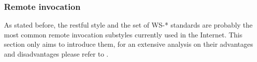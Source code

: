 \subsubsection{Remote invocation}
\label{sec:remote_invocation}


% 
% 


% 


As stated before, the \acs{rest}ful style and the set of WS-* standards are probably the most common remote invocation substyles currently used in the Internet.
This section only aims to introduce them, for an extensive analysis on their advantages and disadvantages please refer to \citet{pautasso_restful_2008}.

